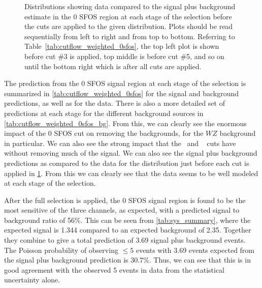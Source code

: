 \begin{figure}[ht!]
\caption{Distributions showing data compared to the signal plus background estimate in the 0 SFOS region at each stage 
of the selection before the cuts are applied to the given distribution. 
Plots should be read sequentially from left to right
and from top to bottom. 
Referring to Table~\ref{tab:cutflow_weighted_0sfos}, the top left
plot is shown before cut \#3 is applied, top middle is before cut \#5, and
so on until the bottom right which is after all cuts are applied.
}
\label{fig:0sfos}
\end{figure}

The prediction from the 0 SFOS signal region at each stage of the selection
is summarized in 
\tab\ref{tab:cutflow_weighted_0sfos}
for the signal and background predictions, as well as for the data.
There is also a more detailed set of predictions at each stage for the 
different background sources in 
\tab\ref{tab:cutflow_weighted_0sfos_bg}. 
From this, we can clearly see the enormous impact of the 0 SFOS
cut on removing the backgrounds, for the $WZ$ background in particular.
We can also see the strong impact that the \nbjet~and \deltaphi~
cuts have without removing much of the signal.
We can also see the signal plus background predictions as 
compared to the data
for the distribution just before each cut is applied in 
\fig\ref{fig:0sfos}. From this we can clearly see
that the data seems to be well modeled at each stage of the selection.

After the full selection is applied,
the 0 SFOS signal region is found to be the most sensitive of the three
channels, as expected, with a predicted signal to background ratio of 56\%.
This can be seen from \tab\ref{tab:sys_summary}, where the expected signal
is 1.344 compared to an expected background of 2.35. Together they 
combine to give a total prediction of 3.69 signal plus background events. 
The Poisson probability of observing $\leq 5$ events with 3.69 events expected 
from the signal plus background prediction is 30.7\%. 
Thus, we can see that this is in good agreement with the observed 5 events in data
from the statistical uncertainty alone. 

